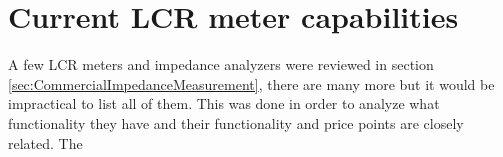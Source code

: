 \section{Current LCR meter capabilities} \label{sec:CurrentLCRMeterCapabilities}
A few LCR meters and impedance analyzers were reviewed in section \ref{sec:CommercialImpedanceMeasurement}, there are many more but it would be impractical to list all of them. This was done in order to analyze what functionality they have and their functionality and price points are closely related. The  


